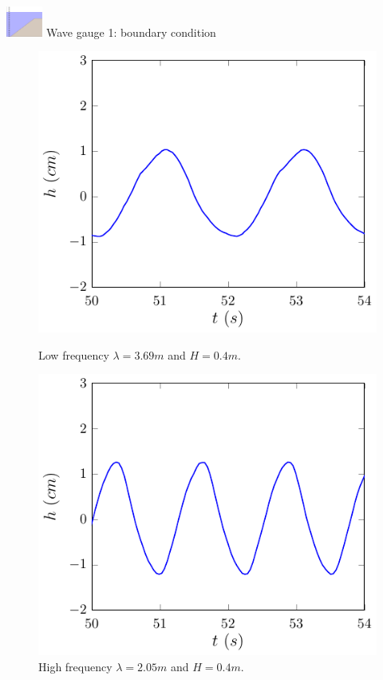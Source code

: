 \documentclass[pdf]{beamer}
\begin{document}
\begin{frame}{\includegraphics[width=1.2cm]{./Pics/WT1z.pdf} \hspace{1cm} Wave gauge 1: boundary condition }
    \begin{figure}
    	\centering
    	\begin{minipage}{.5\textwidth}
    		\centering
    		\includegraphics[width=0.9\linewidth]{./Pics/SLWG1.pdf}
    		\caption{Low frequency $\lambda = 3.69m$ and $H = 0.4m$.}
    	\end{minipage}%
    	\begin{minipage}{.5\textwidth}
    		\centering
    		\includegraphics[width=0.9\linewidth]{./Pics/WG1.pdf}
    		\caption{High frequency $\lambda = 2.05m$ and $H = 0.4m$.}
    	\end{minipage}
    \end{figure}
\end{frame}
\end{document}
